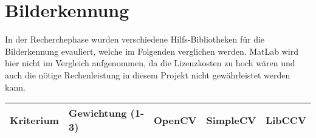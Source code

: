 \section{Bilderkennung}

In der Recherchephase wurden verschiedene Hilfs-Bibliotheken für die Bilderkennung evauliert, welche im Folgenden verglichen werden.
MatLab wird hier nicht im Vergleich aufgenommen, da die Lizenzkosten zu hoch wären und auch die nötige Rechenleistung in diesem Projekt nicht gewährleistet werden kann.

\begin{table}[h]
\begin{tabular}{|p{4.5cm}|p{3.5cm}|p{2cm}|p{2cm}|p{2cm}|}\hline
	
	\textbf{Kriterium}	& 	\textbf{Gewichtung (1-3)} & \textbf{OpenCV} & \textbf{SimpleCV} & \textbf{LibCCV}\\\hline
	
	
	
\end{tabular}\\
\end{table}